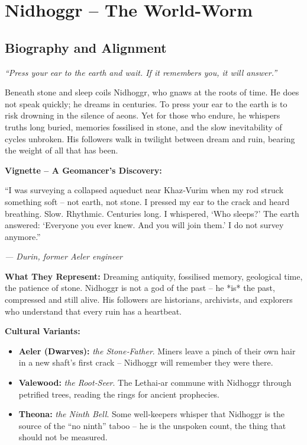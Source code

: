 \documentclass[10pt,a5paper]{book}
\begin{document}
\section{Nidhoggr – The World-Worm}
\label{patron:nidhoggr}

\subsection*{Biography and Alignment}

\textit{“Press your ear to the earth and wait. If it remembers you, it will answer.”}

Beneath stone and sleep coils Nidhoggr, who gnaws at the roots of time. He does not speak quickly; he dreams in centuries. To press your ear to the earth is to risk drowning in the silence of aeons. Yet for those who endure, he whispers truths long buried, memories fossilised in stone, and the slow inevitability of cycles unbroken. His followers walk in twilight between dream and ruin, bearing the weight of all that has been.

\textbf{Vignette – A Geomancer’s Discovery:}
\epigraph{“I was surveying a collapsed aqueduct near Khaz‑Vurim when my rod struck something soft – not earth, not stone. I pressed my ear to the crack and heard breathing. Slow. Rhythmic. Centuries long. I whispered, ‘Who sleeps?’ The earth answered: ‘Everyone you ever knew. And you will join them.’ I do not survey anymore.”}{\textit{— Durin, former Aeler engineer}}

\textbf{What They Represent:} Dreaming antiquity, fossilised memory, geological time, the patience of stone. Nidhoggr is not a god of the past – he *is* the past, compressed and still alive. His followers are historians, archivists, and explorers who understand that every ruin has a heartbeat.

\textbf{Cultural Variants:}
\begin{itemize}
    \item \textbf{Aeler (Dwarves):} \textit{the Stone‑Father}. Miners leave a pinch of their own hair in a new shaft’s first crack – Nidhoggr will remember they were there.
    \item \textbf{Valewood:} \textit{the Root‑Seer}. The Lethai‑ar commune with Nidhoggr through petrified trees, reading the rings for ancient prophecies.
    \item \textbf{Theona:} \textit{the Ninth Bell}. Some well‑keepers whisper that Nidhoggr is the source of the “no ninth” taboo – he is the unspoken count, the thing that should not be measured.
\end{itemize}
\end{document}
